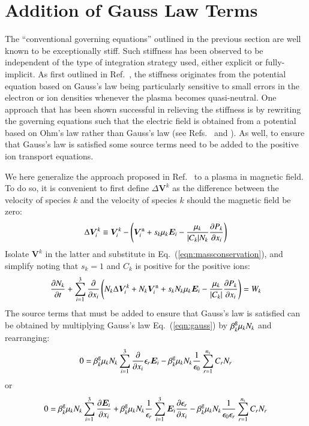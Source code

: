 \documentclass{warpdoc}
\newcommand{\ns}{{n_{\rm s}}}
\renewcommand{\vec}[1]{\bm{#1}}
\begin{document}
\section{Addition of Gauss Law Terms}


The ``conventional governing equations'' outlined in the previous section are well known to be exceptionally stiff. Such stiffness has been observed to be independent of the type of integration strategy used, either explicit or fully-implicit. As first outlined in Ref.\ \cite{jcp:2013:parent}, the stiffness originates from the potential equation based on Gauss's law being particularly sensitive to small errors in the electron or ion densities whenever the plasma becomes quasi-neutral. One approach that has been shown successful in relieving the stiffness is by rewriting the governing equations such that the electric field is obtained from a potential based on Ohm's law rather than Gauss's law (see Refs.\ \cite{jcp:2013:parent} and \cite{jcp:2014:parent}). As well, to ensure that Gauss's law is satisfied some source terms need to be added to the positive ion transport equations. 

We here generalize the approach proposed in Ref.\ \cite{jcp:2014:parent} to a plasma in magnetic field. To do so, it is convenient to first define $\Delta \vec{V}^k$ as the difference between the velocity of species $k$ and the velocity of species $k$ should the magnetic field be zero:
%
\begin{equation}
\Delta \vec{V}^k_i \equiv \vec{V}^k_i - \left(\vec{V}^{\rm n}_i+ s_k \mu_k  \vec{E}_i
             -   \frac{\mu_k}{|C_k| N_k} \frac{\partial P_k}{\partial x_i}\right)
\label{eqn:deltaV}
\end{equation}
%
Isolate $\vec{V}^k$ in the latter and substitute in Eq.\ (\ref{eqn:massconservation}), and simplify noting that $s_k=1$ and $C_k$ is positive for the positive ions: 
%
\begin{equation}
  \frac{\partial N_k}{\partial t} + \sum_{i=1}^3 \frac{\partial}{\partial x_i}  \left(N_k \Delta \vec{V}^k_i+N_k \vec{V}^{\rm n}_i+ s_k N_k \mu_k  \vec{E}_i
             -   \frac{\mu_k}{|C_k|} \frac{\partial P_k}{\partial x_i}\right) = W_k
  \label{eqn:positive_ion_1}
\end{equation}
%
The source terms that must be added to ensure that Gauss's law is satisfied can be obtained by multiplying Gauss's law Eq.\ (\ref{eqn:gauss}) by $\beta_k^{\rm g} \mu_{k} N_{k}$ and rearranging:
%
\begin{equation}
0=\beta_k^{\rm g} \mu_{k} N_{k} \sum_{i=1}^3 \frac{\partial }{\partial x_i}\epsilon_r \vec{E}_i - \beta_k^{\rm g}  \mu_{k} N_{k}\frac{1}{\epsilon_0} \sum_{r=1}^\ns C_r N_r 
\end{equation}
%
or
%
\begin{equation}
0=
 \beta_k^{\rm g} \mu_{k} N_{k}  \sum_{i=1}^3 \frac{\partial \vec{E}_i}{\partial x_i}  
+\beta_k^{\rm g} \mu_{k} N_{k}\frac{1}{\epsilon_r} \sum_{i=1}^3 \vec{E}_i \frac{\partial \epsilon_r}{\partial x_i}  
-\beta_k^{\rm g} \mu_{k} N_{k}\frac{1}{\epsilon_0 \epsilon_r} \sum_{r=1}^\ns C_r N_r 
\end{equation}
%
\end{document}
